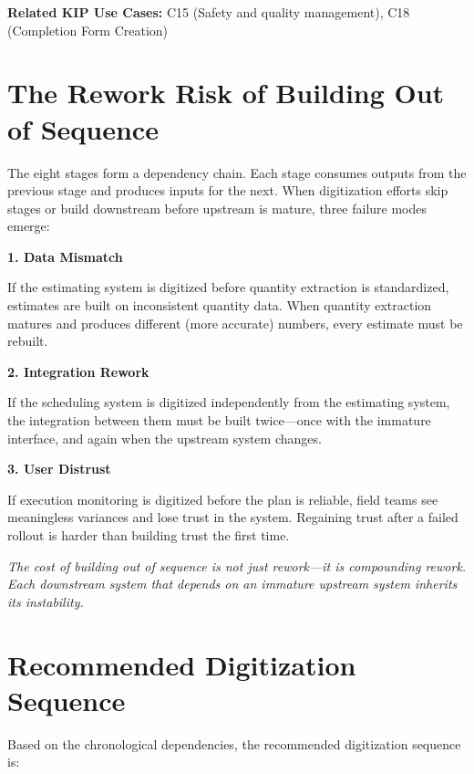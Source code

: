 \documentclass[11pt, letterpaper]{article}
\begin{document}
\textbf{Related KIP Use Cases:} C15 (Safety and quality management), C18 (Completion Form Creation)

\vspace{1.5em}

\section*{The Rework Risk of Building Out of Sequence}

The eight stages form a dependency chain. Each stage consumes outputs from the previous stage and produces inputs for the next. When digitization efforts skip stages or build downstream before upstream is mature, three failure modes emerge:

\textbf{1. Data Mismatch}

If the estimating system is digitized before quantity extraction is standardized, estimates are built on inconsistent quantity data. When quantity extraction matures and produces different (more accurate) numbers, every estimate must be rebuilt.

\textbf{2. Integration Rework}

If the scheduling system is digitized independently from the estimating system, the integration between them must be built twice---once with the immature interface, and again when the upstream system changes.

\textbf{3. User Distrust}

If execution monitoring is digitized before the plan is reliable, field teams see meaningless variances and lose trust in the system. Regaining trust after a failed rollout is harder than building trust the first time.

\vspace{1em}

\begin{center}
\textit{The cost of building out of sequence is not just rework---it is compounding rework.\\Each downstream system that depends on an immature upstream system inherits its instability.}
\end{center}

\vspace{1.5em}

\section*{Recommended Digitization Sequence}

Based on the chronological dependencies, the recommended digitization sequence is:
\end{document}
